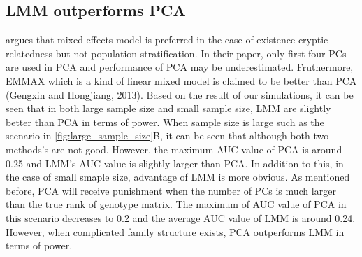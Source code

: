 \documentclass[12pt]{article}
\begin{document}
\subsection{LMM outperforms PCA }

\citet{wang_analytical_2013} argues that mixed effects model is preferred in the case of existence cryptic relatedness but not population stratification.
In their paper, only first four PCs are used in PCA and performance of PCA may be underestimated.
Fruthermore, EMMAX which is a kind of linear mixed model is claimed to be better than PCA (Gengxin and Hongjiang, 2013).
Based on the result of our simulations, it can be seen that in both large sample size and small sample size, LMM are slightly better than PCA in terms of power.
When sample size is large such as the scenario in \cref{fig:large_sample_size}B, it can be seen that although both two methods's are not good.
However, the maximum AUC value of PCA is around 0.25 and LMM's AUC value is slightly larger than PCA.
In addition to this, in the case of small smaple size, advantage of LMM is more obvious.
As mentioned before, PCA will receive punishment when the number of PCs is much larger than the true rank of genotype matrix.
The maximum of AUC value of PCA in this scenario decreases to 0.2 and the average AUC value of LMM is around 0.24.
However, when complicated family structure exists, PCA outperforms LMM in terms of power. 

\citep{sul_mixed_2013}
\citep{price_response_2013}

\citep{tucker_improving_2014}

\printbibliography
\end{document}
